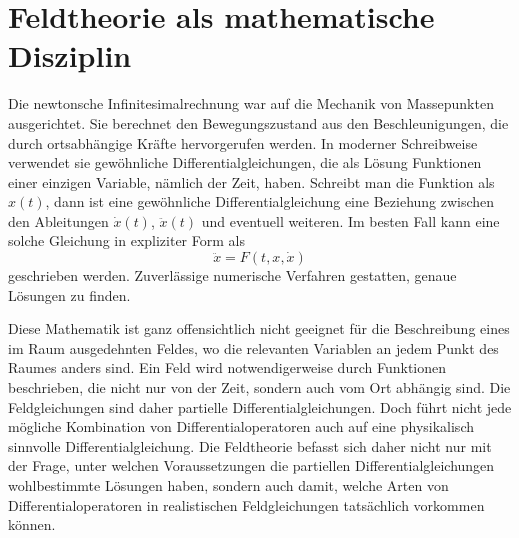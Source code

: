 %
%
%
\section{Feldtheorie als mathematische Disziplin}
Die newtonsche Infinitesimalrechnung war auf die Mechanik von Massepunkten
ausgerichtet.
%
Sie berechnet den Bewegungszustand aus den Beschleunigungen, die durch
ortsabhängige Kräfte hervorgerufen werden.
In moderner Schreibweise verwendet sie gewöhnliche Differentialgleichungen,
die als Lösung Funktionen einer einzigen Variable, nämlich der Zeit, haben.
Schreibt man die Funktion als $x(t)$, dann ist eine
gewöhnliche Differentialgleichung eine Beziehung zwischen den 
%
Ableitungen $\dot{x}(t)$, $\ddot{x}(t)$ und eventuell weiteren.
Im besten Fall kann eine solche Gleichung in expliziter Form als
\[
\ddot{x} = F(t, x, \dot{x})
\]
geschrieben werden.
Zuverlässige numerische Verfahren gestatten, genaue Lösungen zu finden.

Diese Mathematik ist ganz offensichtlich nicht geeignet für die
Beschreibung eines im Raum ausgedehnten Feldes, wo die relevanten
Variablen an jedem Punkt des Raumes anders sind.
Ein Feld wird notwendigerweise durch Funktionen beschrieben, die nicht
nur von der Zeit, sondern auch vom Ort abhängig sind.
Die Feldgleichungen sind daher partielle Differentialgleichungen.
%
%
Doch führt nicht jede mögliche Kombination von Differentialoperatoren
auch auf eine physikalisch sinnvolle Differentialgleichung.
Die Feldtheorie befasst sich daher nicht nur mit der Frage, unter
welchen Voraussetzungen die partiellen Differentialgleichungen
wohlbestimmte Lösungen haben, sondern auch damit, welche Arten von
Differentialoperatoren in realistischen Feldgleichungen tatsächlich
%
vorkommen können.

